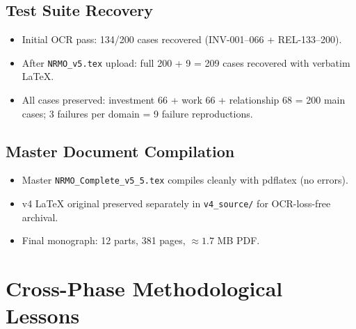\subsection*{Test Suite Recovery}

\begin{itemize}
\item Initial OCR pass: 134/200 cases recovered (INV-001--066 +
REL-133--200).
\item After \texttt{NRMO\_v5.tex} upload: full 200 + 9 = 209 cases
recovered with verbatim LaTeX.
\item All cases preserved: investment 66 + work 66 + relationship
68 = 200 main cases; 3 failures per domain = 9 failure
reproductions.
\end{itemize}

\subsection*{Master Document Compilation}

\begin{itemize}
\item Master \texttt{NRMO\_Complete\_v5\_5.tex} compiles cleanly
with pdflatex (no errors).
\item v4 LaTeX original preserved separately in \texttt{v4\_source/}
for OCR-loss-free archival.
\item Final monograph: 12 parts, 381 pages, $\approx 1.7$ MB PDF.
\end{itemize}

\section{Cross-Phase Methodological Lessons}
\label{sec:session-log-cross-phase}


